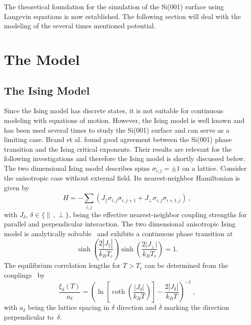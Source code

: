 	The theoretical foundation for the simulation of the Si(001) surface using Langevin equations is now established. The following section will deal with the modeling of the several times mentioned potential.
	\section{The Model}
	\subsection{The Ising Model} \label{Section::Ising-Model}		
	Since the Ising model has discrete states, it is not suitable for continuous modeling with equations of motion. However, the Ising model is well known and has been used several times \cite{brand2023dimer, pillay2004revisit, ihm1983structural, schaller2023sequential} to study the Si(001) surface and can serve as a limiting case. Brand et al. \cite{brand2023critical} found good agreement between the Si(001) phase transition and the Ising critical exponents.  Their results are relevant for the following investigations and therefore the Ising model is shortly discussed below. \\
	
	The two dimensional Ising model describes spins $\sigma_{i ,j}=\pm 1$ on a lattice. Consider the anisotropic case without external field. Its nearest-neighbor Hamiltonian is given by
	\begin{equation} \label{Eq::Ising-Hamiltonian}
		H =	- \sum_{i,j}^{} \left(J_\parallel \sigma_{i ,j} \sigma_{i ,j + 1} + J_\perp \sigma_{i, j} \sigma_{i +1 ,j} \right) ~,
	\end{equation}
	with $J_{\delta}$, $\delta \in \{\parallel\,, \perp\}$, being the effective nearest-neighbor coupling strengths for parallel and perpendicular interaction. The two dimensional anisotropic Ising model is analytically solvable~\cite{onsager1944crystal} and exhibits a continuous phase transition at
	\begin{equation} \label{Eq::Crit-Temp-Ising}
		\sinh \left( \frac{2 |J_\parallel|}{k_B T_c} \right) \sinh \left( \frac{2 |J_\perp|}{k_B T_c}\right) =	1.
	\end{equation}
	The equilibrium correlation lengths for $T > T_c$ can be determined from the couplings~\cite{mccoy1973two} by
	\begin{equation} \label{Eq::Ising-Corrlength-Coupling}
		\frac{\xi_\delta(T)}{a_\delta} =	\left(\ln \left[ \coth \left(\frac{|J_\delta|}{k_B T}\right)\right] - \frac{2 |J_{\overline{\delta}}|}{k_B T}\right)^{-1} ~,
	\end{equation}
	with $a_\delta$ being the lattice spacing in $\delta$ direction and $\overline{\delta}$ marking the direction perpendicular to~$\delta$. \\
	
